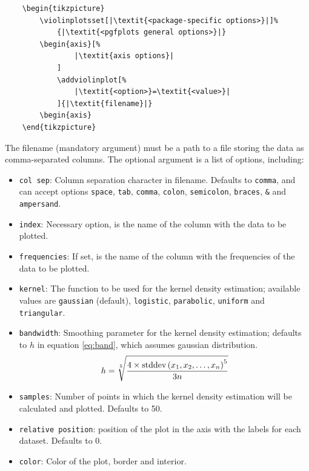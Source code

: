 \documentclass{article}
\begin{document}
\begin{verbatim}
	\begin{tikzpicture}
		\violinplotsset[|\textit{<package-specific options>}|]%
			{|\textit{<pgfplots general options>}|}
		\begin{axis}[%
				|\textit{axis options}|
			]
			\addviolinplot[%
				|\textit{<option>}=\textit{<value>}|
			]{|\textit{filename}|}
		\begin{axis}
	\end{tikzpicture}
\end{verbatim}

The filename (mandatory argument) must be a path to a file storing the data as
comma-separated columns. The optional argument is a list of options, including:

\begin{itemize}
	\item \texttt{col sep}: Column separation character in filename.
		Defaults to \texttt{comma}, and can accept options
		\texttt{space}, \texttt{tab}, \texttt{comma},
		\texttt{colon}, \texttt{semicolon}, \texttt{braces},
		\texttt{\&} and \texttt{ampersand}.
	\item \texttt{index}: Necessary option, is the name of the column with
		the data to be plotted.
	\item \texttt{frequencies}: If set, is the name of the column with
		the frequencies of the data to be plotted.
	\item \texttt{kernel}: The function to be used for the kernel density
		estimation; available values are \texttt{gaussian} (default),
		\texttt{logistic}, \texttt{parabolic}, \texttt{uniform}
		and \texttt{triangular}.
	\item \texttt{bandwidth}: Smoothing parameter for the kernel density
		estimation; defaults to $h$ in equation \ref{eq:band},
		which assumes gaussian distribution.
		\begin{equation}
			\label{eq:band}
			h=\sqrt[5]{\frac{4\times\textnormal{stddev}%
			\left(x_1,x_2,\ldots,x_n\right)^5}{3n}}
		\end{equation}
	\item \texttt{samples}: Number of points in which the kernel density
		estimation will be calculated and plotted. Defaults
		to 50.
	\item \texttt{relative position}: position of the plot in the axis
		with the labels for each dataset. Defaults to 0.
	\item \texttt{color}: Color of the plot, border and interior.

\end{itemize}
\end{document}
